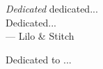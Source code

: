\thispagestyle{empty}
{}

\vspace*{3cm}

\begin{center}
    \emph{Dedicated} dedicated... \\
    Dedicated... \\ \medskip
    --- Lilo \& Stitch    
\end{center}

\medskip

\begin{center}
    Dedicated to ... \\ \smallskip
    
\end{center}